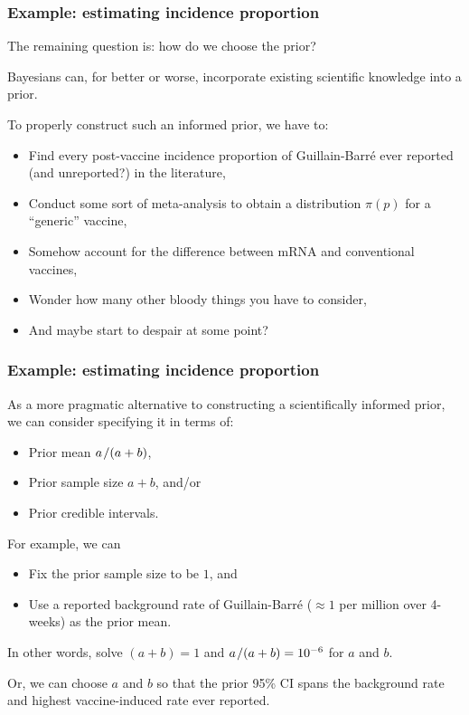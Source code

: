 \documentclass[18pt, handout]{beamer}
\newenvironment{narrowItemize}[1][]{%
  \vspace{-.3\baselineskip}%
  \begin{itemize}[#1]
  \addtolength\itemsep{-.1\baselineskip}
}{
  \end{itemize}
}
\newcommand{\divby}{\thinnerspace /}
\newcommand{\thinnerspace}{\mskip.5\thinmuskip}
\begin{document}
\begin{frame}
\frametitle{Example: estimating incidence proportion}

The remaining question is: how do we choose the prior?

\pause
Bayesians can, for better or worse, incorporate existing scientific knowledge into a prior.

\pause
To properly construct such an informed prior, we have to:
\pause%
\begin{narrowItemize}[<+->]
\item Find every post-vaccine incidence proportion of Guillain-Barré ever reported (and unreported?) in the literature, 
\item Conduct some sort of meta-analysis to obtain a distribution $\pi(p)$ for a ``generic'' vaccine, 
\item Somehow account for the difference between mRNA and conventional vaccines, 
\item Wonder how many other bloody things you have to consider,
\item And maybe start to despair at some point?
\end{narrowItemize}
\end{frame}

\begin{frame}
\frametitle{Example: estimating incidence proportion}

As a more pragmatic alternative to constructing a scientifically informed prior, we can consider specifying it in terms of: 
\vspace*{-.1\baselineskip}
\begin{narrowItemize}
\item Prior mean $a \divby (a + b)$,
\item Prior sample size $a + b$, and/or
\item Prior credible intervals.
\end{narrowItemize}
\vspace*{-.1\baselineskip}

\pause
For example, we can 
\vspace*{-.1\baselineskip}
\begin{narrowItemize}
\item Fix the prior sample size to be $1$, and
\item Use a reported background rate of Guillain-Barré ($\approx 1$ per million over 4-weeks) as the prior mean.
\end{narrowItemize}
\vspace*{-.4\baselineskip}
\pause
In other words, solve $(a + b) = 1$ and $a \divby (a + b) = 10^{-6}$ for $a$ and $b$. %

\pause
Or, we can choose $a$ and $b$ so that the prior 95\% CI spans the background rate and highest vaccine-induced rate ever reported.%

\end{frame}
\end{document}
